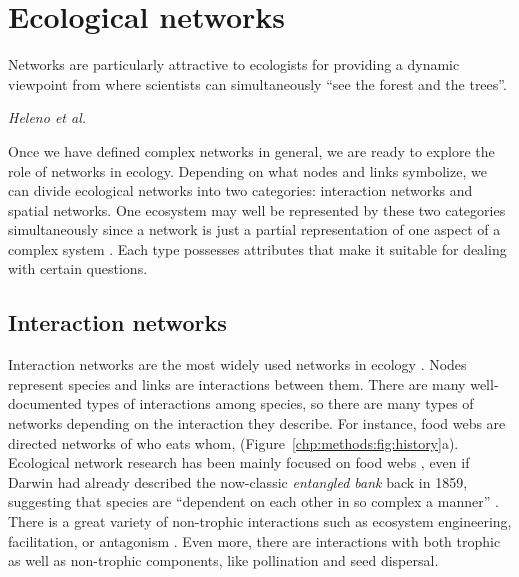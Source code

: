 \section{Ecological networks}\label{chp:methods:econet}
\epigraph{Networks are particularly attractive to ecologists for providing a dynamic viewpoint from where scientists can simultaneously “see the forest and the trees”.}{\textit{Heleno et al.} \cite{heleno2014ecological}}
Once we have defined complex networks in general, we are ready to explore the role of networks in ecology. Depending on what nodes and links symbolize, we can divide ecological networks into two categories: interaction networks and spatial networks. %
One ecosystem may well be represented by these two categories simultaneously since a network is just a partial representation of one aspect of a complex system \cite{strogatz2001exploring}. Each type possesses attributes that make it suitable for dealing with certain questions.\\



\subsection{Interaction networks}

Interaction networks are the most widely used networks in ecology \cite{kefi2020theoretical}. Nodes represent species and links are interactions between them. There are many well-documented types of interactions among species, so there are many types of networks depending on the interaction they describe. For instance, food webs are directed networks  of who eats whom, (Figure~\ref{chp:methods:fig:history}a). Ecological network research has been mainly focused  on food webs \cite{pascual2006ecological}, even if Darwin had already described the now-classic \textit{entangled bank} back in 1859, suggesting that species are ``dependent on each other in so complex a manner'' \cite{darwin1859origin}. There is a great variety of non-trophic interactions such as ecosystem engineering, facilitation, or antagonism \cite{kefi2012more}. Even more, there are interactions with  both trophic as well as non-trophic components, like pollination and seed dispersal.\\


